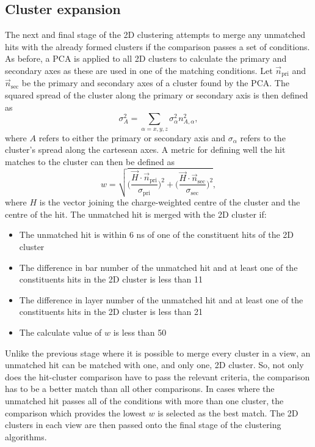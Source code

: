 \subsection{Cluster expansion}
\label{subsec:ECalExpandClusters}
The next and final stage of the 2D clustering attempts to merge any unmatched hits with the already formed clusters if the comparison passes a set of conditions.  As before, a PCA is applied to all 2D clusters to calculate the primary and secondary axes as these are used in one of the matching conditions.  Let $\vec{n}_{\mathrm{pri}}$ and $\vec{n}_{\mathrm{sec}}$ be the primary and secondary axes of a cluster found by the PCA.  The squared spread of the cluster along the primary or secondary axis is then defined as
\begin{equation}
  \sigma_A^2 = \sum_{\alpha = x,y,z} \sigma_\alpha^2n_{A,\alpha}^2,
\end{equation}
where $A$ refers to either the primary or secondary axis and $\sigma_\alpha$ refers to the cluster's spread along the cartesean axes.  A metric for defining well the hit matches to the cluster can then be defined as 
\begin{equation}
  w = \sqrt{\Bigg(\frac{\vec{H}\cdot \vec{n}_{\mathrm{pri}}}{\sigma_{\mathrm{pri}}}\Bigg)^2 +  \Bigg(\frac{\vec{H}\cdot \vec{n}_{\mathrm{sec}}}{\sigma_{\mathrm{sec}}}\Bigg)^2},
\end{equation}
where $H$ is the vector joining the charge-weighted centre of the cluster and the centre of the hit.  The unmatched hit is merged with the 2D cluster if:
\begin{itemize}
  \item The unmatched hit is within 6 ns of one of the constituent hits of the 2D cluster
  \item The difference in bar number of the unmatched hit and at least one of the constituents hits in the 2D cluster is less than 11
  \item The difference in layer number of the unmatched hit and at least one of the constituents hits in the 2D cluster is less than 21
  \item The calculate value of $w$ is less than 50
\end{itemize}
Unlike the previous stage where it is possible to merge every cluster in a view, an unmatched hit can be matched with one, and only one, 2D cluster. So, not only does the hit-cluster comparison have to pass the relevant criteria, the comparison has to be a better match than all other comparisons.  In cases where the unmatched hit passes all of the conditions with more than one cluster, the comparison which provides the lowest $w$ is selected as the best match.
\newline
The 2D clusters in each view are then passed onto the final stage of the clustering algorithms.

